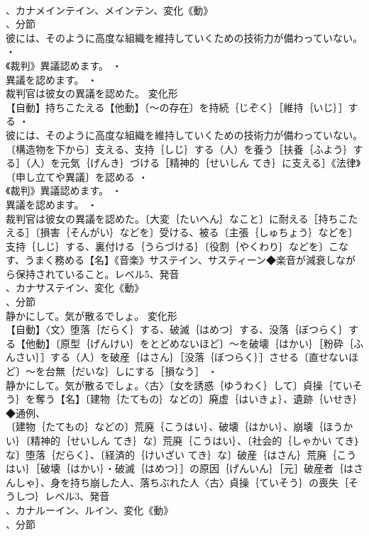 \documentclass[8pt]{extreport}
\begin{document}
\begin{CJK}{UTF8}{min}
\\	、カナメインテイン、メインテン、変化《動》
\\	、分節
\\	彼には、そのように高度な組織を維持していくための技術力が備わっていない。 ・
\\	《裁判》異議認めます。 ・
\\	異議を認めます。 ・
\\	裁判官は彼女の異議を認めた。	変化形 
\\	【自動】持ちこたえる【他動】〔～の存在〕を持続｛じぞく｝［維持｛いじ｝］する ・
\\	彼には、そのように高度な組織を維持していくための技術力が備わっていない。〔構造物を下から〕支える、支持｛しじ｝する（人）を養う［扶養｛ふよう｝する］（人）を元気｛げんき｝づける［精神的｛せいしん てき｝に支える］《法律》〔申し立てや異議〕を認める ・
\\	《裁判》異議認めます。 ・
\\	異議を認めます。 ・
\\	裁判官は彼女の異議を認めた。〔大変｛たいへん｝なこと〕に耐える［持ちこたえる］〔損害｛そんがい｝などを〕受ける、被る〔主張｛しゅちょう｝などを〕支持｛しじ｝する、裏付ける｛うらづける｝〔役割｛やくわり｝などを〕こなす、うまく務める【名】《音楽》サステイン、サスティーン◆楽音が減衰しながら保持されていること。レベル5、発音
\\	、カナサステイン、変化《動》
\\	、分節
\\	静かにして。気が散るでしょ。	変化形 
\\	【自動】〈文〉堕落｛だらく｝する、破滅｛はめつ｝する、没落｛ぼつらく｝する【他動】〔原型｛げんけい｝をとどめないほど〕～を破壊｛はかい｝［粉砕｛ふんさい｝］する（人）を破産｛はさん｝［没落｛ぼつらく｝］させる〔直せないほど〕～を台無｛だいな｝しにする［損なう］ ・
\\	静かにして。気が散るでしょ。〈古〉〔女を誘惑｛ゆうわく｝して〕貞操｛ていそう｝を奪う【名】〔建物｛たてもの｝などの〕廃虚｛はいきょ｝、遺跡｛いせき｝◆通例、
\\	〔建物｛たてもの｝などの〕荒廃｛こうはい｝、破壊｛はかい｝、崩壊｛ほうかい｝〔精神的｛せいしん てき｝な〕荒廃｛こうはい｝、〔社会的｛しゃかい てき｝な〕堕落｛だらく｝、〔経済的｛けいざい てき｝な〕破産｛はさん｝荒廃｛こうはい｝［破壊｛はかい｝・破滅｛はめつ｝］の原因｛げんいん｝［元］破産者｛はさんしゃ｝、身を持ち崩した人、落ちぶれた人〈古〉貞操｛ていそう｝の喪失｛そうしつ｝レベル3、発音
\\	、カナルーイン、ルイン、変化《動》
\\	、分節

\end{CJK}
\end{document}
